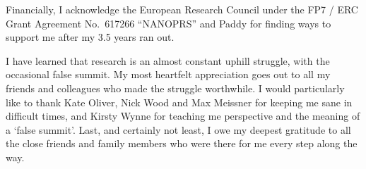 Financially, I acknowledge the European Research Council under the FP7 / ERC Grant Agreement No.\ 617266 ``NANOPRS'' and Paddy for finding ways to support me after my 3.5 years ran out.

I have learned that research is an almost constant uphill struggle, with the occasional false summit.
My most heartfelt appreciation goes out to all my friends and colleagues who made the struggle worthwhile.
I would particularly like to thank Kate Oliver, Nick Wood and Max Meissner for keeping me sane in difficult times, and Kirsty Wynne for teaching me perspective and the meaning of a `false summit'.
Last, and certainly not least, I owe my deepest gratitude to all the close friends and family members who were there for me every step along the way.

